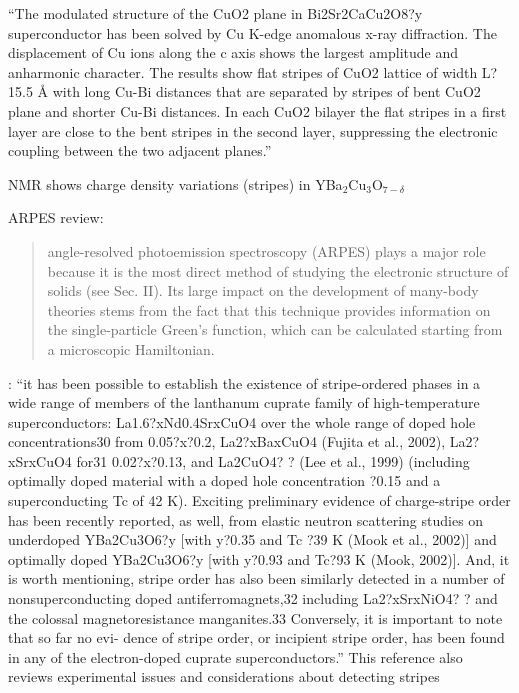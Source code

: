 \cite{Bianconi1996a} ``The modulated structure of the CuO2 plane in Bi2Sr2CaCu2O8?y superconductor has been solved by Cu K-edge anomalous x-ray diffraction. The displacement of Cu ions along the c axis shows the largest amplitude
and anharmonic character. The results show flat stripes of CuO2 lattice of width L?15.5 Å with long Cu-Bi distances that are separated by stripes of bent CuO2 plane and shorter Cu-Bi distances. In each CuO2 bilayer the flat stripes in a first layer are close to the bent stripes in the second layer, suppressing the electronic coupling between the two adjacent planes.''

NMR shows charge density variations (stripes) in YBa$_2$Cu$_3$O$_{7-\delta}$ \cite{Haase2003}

ARPES review: \cite{Damascelli2003}
\begin{quote}
  angle-resolved photoemission spectroscopy (ARPES) plays a major role because it is the most direct method of studying the electronic structure of solids (see Sec. II). Its large impact on the development of many-body theories stems from the fact that this technique provides information on the single-particle Green’s function, which can be calculated starting from a microscopic Hamiltonian.
\end{quote}

\cite{Kivelson2003}: ``it has been possible to establish the existence of stripe-ordered phases in a wide range of members of the lanthanum cuprate family of high-temperature superconductors:
La1.6?xNd0.4SrxCuO4 over the whole range of doped hole concentrations30 from 0.05?x?0.2, La2?xBaxCuO4 (Fujita et al., 2002), La2?xSrxCuO4 for31 0.02?x?0.13, and La2CuO4?
? (Lee et al., 1999) (including optimally doped material with a doped hole concentration ?0.15
and a superconducting Tc of 42 K). Exciting preliminary evidence of charge-stripe order has been recently reported, as well, from elastic neutron scattering studies
on underdoped YBa2Cu3O6?y [with y?0.35 and Tc ?39 K (Mook et al., 2002)] and optimally doped
YBa2Cu3O6?y [with y?0.93 and Tc?93 K (Mook, 2002)]. And, it is worth mentioning, stripe order has also been similarly detected in a number of nonsuperconducting doped antiferromagnets,32
including La2?xSrxNiO4? ? and the colossal magnetoresistance
manganites.33 Conversely, it is important to note that so far no evi-
dence of stripe order, or incipient stripe order, has been found in any of the electron-doped cuprate superconductors.''
This reference also reviews experimental issues and considerations about detecting stripes

